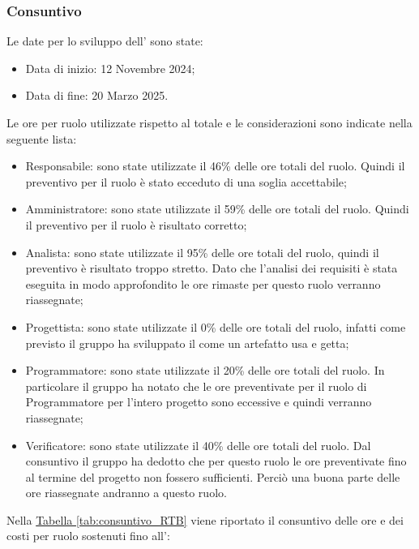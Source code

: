 \subsubsection{Consuntivo}
Le date per lo sviluppo dell' sono state:
\begin{itemize}
    \item Data di inizio: 12 Novembre 2024;
    \item Data di fine: 20 Marzo 2025.
\end{itemize}
Le ore per ruolo utilizzate rispetto al totale e le considerazioni sono indicate nella seguente lista:
\begin{itemize}
    \item Responsabile: sono state utilizzate il 46\% delle ore totali del ruolo.
    Quindi il preventivo per il ruolo è stato ecceduto di una soglia accettabile;

    \item Amministratore: sono state utilizzate il 59\% delle ore totali del ruolo.
    Quindi il preventivo per il ruolo è risultato corretto;
    
    
    \item Analista: sono state utilizzate il 95\% delle ore totali del ruolo, quindi il preventivo è risultato troppo stretto.
    Dato che l'analisi dei requisiti è stata eseguita in modo approfondito le ore rimaste per questo ruolo verranno riassegnate;

    \item Progettista: sono state utilizzate il 0\% delle ore totali del ruolo, infatti come previsto il gruppo ha sviluppato il  come un artefatto usa e getta;
    
    \item Programmatore: sono state utilizzate il 20\% delle ore totali del ruolo.
    In particolare il gruppo ha notato che le ore preventivate per il ruolo di Programmatore per l'intero progetto sono eccessive e quindi verranno riassegnate;
    
    \item Verificatore: sono state utilizzate il 40\% delle ore totali del ruolo.
    Dal consuntivo il gruppo ha dedotto che per questo ruolo le ore preventivate fino al termine del progetto non fossero sufficienti. Perciò una buona parte delle ore riassegnate andranno a questo ruolo.
\end{itemize}
Nella \hyperref[tab:consuntivo_RTB]{Tabella \ref{tab:consuntivo_RTB}} viene riportato il consuntivo delle ore e dei costi per ruolo sostenuti fino all':
